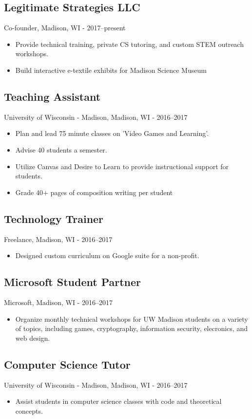 \documentclass[../main.tex]{subfiles}
\begin{document}
	\subsection*{Legitimate Strategies LLC}
	Co-founder, Madison, WI - 2017--present
	\begin{itemize}
		\item{Provide technical training, private CS tutoring, and custom STEM outreach workshops.}
		\item{Build interactive e-textile exhibits for Madison Science Museum}
	\end{itemize}

	\subsection*{Teaching Assistant}
     University of Wisconsin - Madison, Madison, WI - 2016--2017
	\begin{itemize}
		\item{Plan and lead 75 minute classes on 'Video Games and Learning'.}
		\item{Advise 40 students a semester.}
		\item{Utilize Canvas and Desire to Learn to provide instructional support for students.}
		\item{Grade 40+ pages of composition writing per student}
	\end{itemize}

	\subsection*{Technology Trainer}
     Freelance, Madison, WI - 2016--2017
	\begin{itemize}
		\item{Designed custom curriculum on Google suite for a non-profit.}
	\end{itemize}


	\subsection*{Microsoft Student Partner}
     Microsoft, Madison, WI - 2016--2017
	\begin{itemize}
		\item{Organize monthly technical workshops for UW Madison students on a variety of topics, including games, cryptography, information security, elecronics, and web design.}
	\end{itemize}

	\subsection*{Computer Science Tutor}
     University of Wisconsin - Madison, Madison, WI - 2016--2017
	\begin{itemize}
		\item{Assist students in computer science classes with code and theoretical concepts.}
	\end{itemize}
\end{document}
